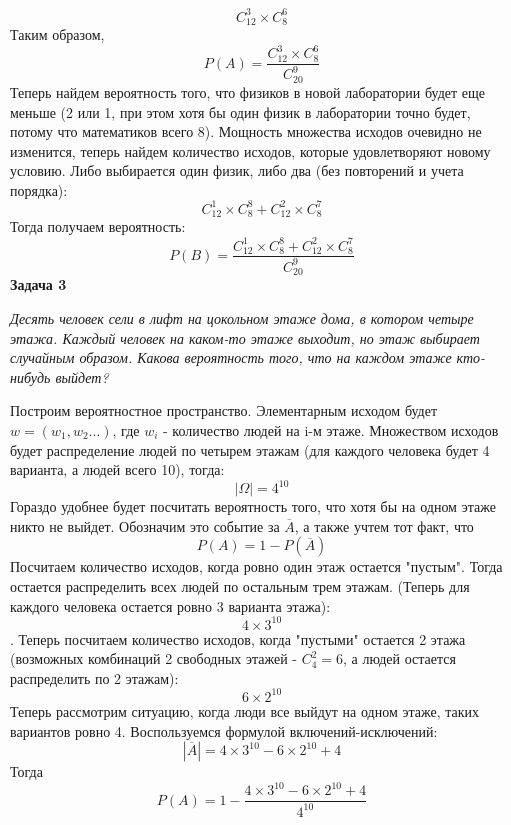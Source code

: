 \documentclass{article}
\begin{document}
$$C_{12}^3\times C_8^6$$
Таким образом,
$$P(A)=\frac{C_{12}^3\times C_8^6}{C_{20}^9}$$
Теперь найдем вероятность того, что физиков в новой лаборатории будет еще меньше (2 или 1, при этом хотя бы один физик в лаборатории точно будет, потому что математиков всего 8). Мощность множества исходов очевидно не изменится, теперь найдем количество исходов, которые удовлетворяют новому условию. Либо выбирается один физик, либо два (без повторений и учета порядка):
$$C_{12}^1\times C_8^8+C_{12}^2\times C_8^7$$
Тогда получаем вероятность:
$$P(B)=\frac{C_{12}^1\times C_8^8+C_{12}^2\times C_8^7}{C_{20}^9}$$
\textbf{Задача 3}
\begin{center}
\textit{Десять человек сели в лифт на цокольном этаже дома, в котором четыре этажа. Каждый человек на каком-то этаже выходит, но этаж выбирает случайным образом. Какова вероятность того, что на каждом этаже кто-нибудь выйдет?} 
\end{center}
Построим вероятностное пространство. Элементарным исходом будет $w=(w_1, w_2...)$, где $w_i$ - количество людей на i-м этаже. Множеством исходов будет распределение людей по четырем этажам (для каждого человека будет 4 варианта, а людей всего 10), тогда:
$$|\Omega|=4^{10}$$
 Гораздо удобнее будет посчитать вероятность того, что хотя бы на одном этаже никто не выйдет. Обозначим это событие за $\overline{A}$, а также учтем тот факт, что
 $$P(A)=1-P(\overline{A})$$
 Посчитаем количество исходов, когда ровно один этаж остается "пустым". Тогда остается распределить всех людей по остальным трем этажам. (Теперь для каждого человека остается ровно 3 варианта этажа):
  $$4\times 3^{10}$$.
  Теперь посчитаем количество исходов, когда "пустыми" остается 2 этажа (возможных комбинаций 2 свободных этажей - $C_{4}^2 = 6$, а людей остается распределить по 2 этажам):
  $$6\times2^{10}$$
  Теперь рассмотрим ситуацию, когда люди все выйдут на одном этаже, таких вариантов ровно 4.
  Воспользуемся формулой включений-исключений:
  $$|\overline{A}| = 4\times 3^{10} - 6\times2^{10} + 4$$
  Тогда $$P(A) = 1 - \frac{4\times 3^{10} - 6\times2^{10} + 4}{4^{10}}$$
\end{document}
